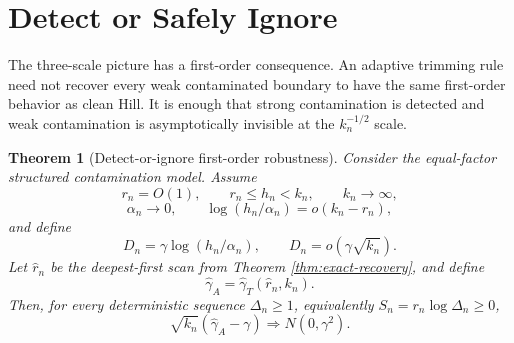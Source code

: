 \documentclass[11pt]{article}
\newtheorem{theorem}{Theorem}
\begin{document}
\section{Detect or Safely Ignore}

The three-scale picture has a first-order consequence.  An adaptive trimming
rule need not recover every weak contaminated boundary to have the same
first-order behavior as clean Hill.  It is enough that strong contamination is
detected and weak contamination is asymptotically invisible at the
$k_n^{-1/2}$ scale.

\begin{theorem}[Detect-or-ignore first-order robustness]
\label{thm:detect-ignore}
Consider the equal-factor structured contamination model.  Assume
\[
  r_n=O(1),\qquad r_n\le h_n<k_n,\qquad k_n\to\infty,
\]
\[
  \alpha_n\to0,\qquad
  \log(h_n/\alpha_n)=o(k_n-r_n),
\]
and define
\[
  D_n=\gamma\log(h_n/\alpha_n),
  \qquad
  D_n=o(\gamma\sqrt{k_n}).
\]
Let $\widehat r_n$ be the deepest-first scan from Theorem
\ref{thm:exact-recovery}, and define
\[
  \widehat\gamma_A=\widehat\gamma_T(\widehat r_n,k_n).
\]
Then, for every deterministic sequence $\Delta_n\ge1$, equivalently
$S_n=r_n\log\Delta_n\ge0$,
\[
  \sqrt{k_n}(\widehat\gamma_A-\gamma)
  \Rightarrow
  N(0,\gamma^2).
\]
\end{theorem}
\end{document}
